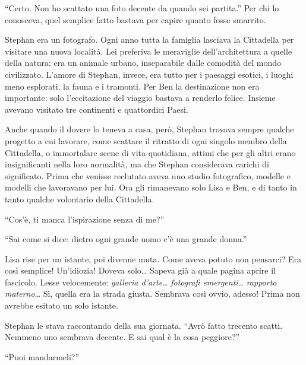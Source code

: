 \documentclass[a4paper,oneside,11pt]{memoir}
\begin{document}
``Certo. Non ho scattato una foto decente da quando sei partita.'' Per chi lo
conosceva, quel semplice fatto bastava per capire quanto fosse smarrito.

Stephan era un fotografo. Ogni anno tutta la famiglia lasciava la Cittadella per
visitare una nuova località. Lei preferiva le meraviglie dell'architettura a
quelle della natura: era un animale urbano, inseparabile dalle comodità del
mondo civilizzato. L'amore di Stephan, invece, era tutto per i paesaggi esotici,
i luoghi meno esplorati, la fauna e i tramonti. Per Ben la destinazione non era
importante: solo l'eccitazione del viaggio bastava a renderlo felice. Insieme
avevano visitato tre continenti e quattordici Paesi.



Anche quando il dovere lo teneva a casa, però, Stephan trovava sempre qualche
progetto a cui lavorare, come scattare il ritratto di ogni singolo membro della
Cittadella, o immortalare scene di vita quotidiana, attimi che per gli altri
erano insignificanti nella loro normalità, ma che Stephan considerava carichi di
significato. Prima che venisse reclutato aveva uno studio fotografico, modelle e
modelli che lavoravano per lui. Ora gli rimanevano solo Lisa e Ben, e di tanto
in tanto qualche volontario della Cittadella.

``Cos'è, ti manca l'ispirazione senza di me?''

``Sai come si dice: dietro ogni grande uomo c'è una grande donna.''

Lisa rise per un istante, poi divenne muta. Come aveva potuto non pensarci? Era
così semplice! Un'idiozia! Doveva solo\dots{} Sapeva già a quale pagina aprire
il fascicolo. Lesse velocemente: \emph{galleria d'arte}\dots{} \emph{fotografi
emergenti}\dots{} \emph{rapporto materno}\dots{} Sì, quella era la strada
giusta. Sembrava così ovvio, adesso! Prima non avrebbe esitato un solo istante.

Stephan le stava raccontando della sua giornata. ``Avrò fatto trecento scatti.
Nemmeno uno sembrava decente. E sai qual è la cosa peggiore?''

``Puoi mandarmeli?''
\end{document}
